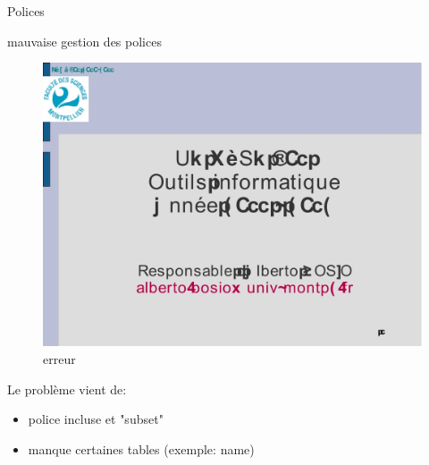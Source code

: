 \begin{frame}{Polices}
	\begin{block}{mauvaise gestion des polices}
		\begin{figure}[h]
        		\begin{center}
         		\includegraphics[scale=0.17]{images/fail2.jpg} 
        		\end{center}
        		\caption{erreur}
        		\label{erreur}
    		\end{figure}
	\end{block}
\end{frame}

\begin{frame}{}
Le problème vient de:
\begin{itemize}
\item police incluse et "subset"
\item manque certaines tables (exemple: name)
\end{itemize}	
\end{frame}

